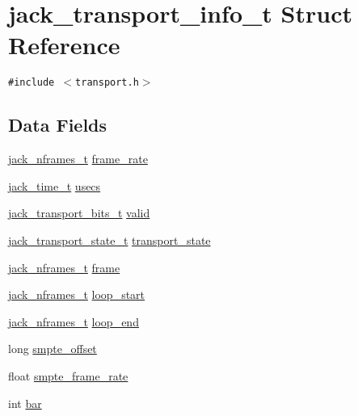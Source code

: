 \hypertarget{structjack__transport__info__t}{
\section{jack\_\-transport\_\-info\_\-t Struct Reference}
\label{structjack__transport__info__t}
}
{\tt \#include $<$transport.h$>$}

\subsection*{Data Fields}
\begin{CompactItemize}
\item 
\hyperlink{types_8h_fe9972a13782c1e282747fdb4bc46f9c}{jack\_\-nframes\_\-t} \hyperlink{structjack__transport__info__t_74278f5e2398691cd7a0854aeeb3ae4c}{frame\_\-rate}
\item 
\hyperlink{types_8h_71d1a1356a36ae1f9e60b4361e21905e}{jack\_\-time\_\-t} \hyperlink{structjack__transport__info__t_edb03a0d7fde02d2a6f0470bdce6e92a}{usecs}
\item 
\hyperlink{transport_8h_25433447d7aa9851e5af2c1b55f8da63}{jack\_\-transport\_\-bits\_\-t} \hyperlink{structjack__transport__info__t_9f7d0ee82b6a6ca7ddeae841f3253059}{valid}
\item 
\hyperlink{transport_8h_499ffea77b03cce9c647d7b5065f7338}{jack\_\-transport\_\-state\_\-t} \hyperlink{structjack__transport__info__t_40308c8c7d6b7c0a4f8ecfcfd35e3875}{transport\_\-state}
\item 
\hyperlink{types_8h_fe9972a13782c1e282747fdb4bc46f9c}{jack\_\-nframes\_\-t} \hyperlink{structjack__transport__info__t_dcf3e36ee8115282aad46485cab6a4be}{frame}
\item 
\hyperlink{types_8h_fe9972a13782c1e282747fdb4bc46f9c}{jack\_\-nframes\_\-t} \hyperlink{structjack__transport__info__t_f992fbfb657288cf1292dd591df8fcd5}{loop\_\-start}
\item 
\hyperlink{types_8h_fe9972a13782c1e282747fdb4bc46f9c}{jack\_\-nframes\_\-t} \hyperlink{structjack__transport__info__t_02e551f8c456f2d9b65f7ca7a7c763ff}{loop\_\-end}
\item 
long \hyperlink{structjack__transport__info__t_3fb2f2def734ead6b273a86f1d961c72}{smpte\_\-offset}
\item 
float \hyperlink{structjack__transport__info__t_5bf07b5a4d5c0c7d64d3d92910f2af31}{smpte\_\-frame\_\-rate}
\item 
int \hyperlink{structjack__transport__info__t_37b51d194a7513e45b56f6524f2d51f2}{bar}

\end{CompactItemize}
